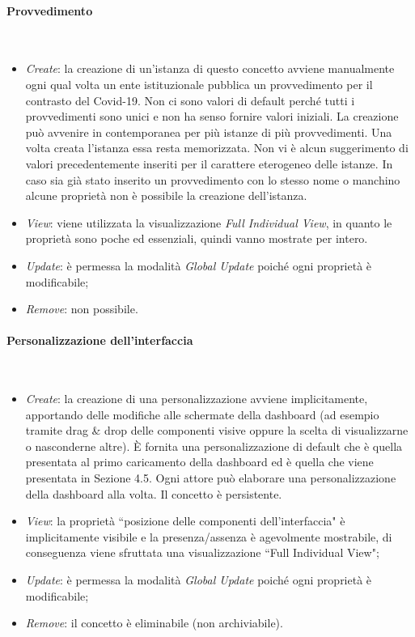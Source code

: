 \paragraph{Provvedimento}\mbox{}\\
\begin{itemize}
    \item \textit{Create}: la creazione di un'istanza di questo concetto avviene manualmente ogni qual volta un ente istituzionale pubblica un provvedimento per il contrasto del Covid-19.
    Non ci sono valori di default perché tutti i provvedimenti sono unici e non ha senso fornire valori iniziali.
    La creazione può avvenire in contemporanea per più istanze di più provvedimenti.
    Una volta creata l'istanza essa resta memorizzata.
    Non vi è alcun suggerimento di valori precedentemente inseriti per il carattere eterogeneo delle istanze.
    In caso sia già stato inserito un provvedimento con lo stesso nome o manchino alcune proprietà non è possibile la creazione dell'istanza.
    \item \textit{View}: viene utilizzata la visualizzazione \textit{Full Individual View}, in quanto le proprietà sono poche ed essenziali, quindi vanno mostrate per intero.
    \item \textit{Update}: è permessa la modalità \textit{Global Update} poiché ogni proprietà è modificabile;
    \item \textit{Remove}: non possibile.
\end{itemize}

\paragraph{Personalizzazione dell'interfaccia}\mbox{}\\
\begin{itemize}
    \item \textit{Create}: la creazione di una personalizzazione avviene implicitamente, apportando delle modifiche alle schermate della dashboard (ad esempio tramite drag \& drop delle componenti visive oppure la scelta di visualizzarne o nasconderne altre).
    È fornita una personalizzazione di default che è quella presentata al primo caricamento della dashboard ed è quella che viene presentata in Sezione 4.5.
    Ogni attore può elaborare una personalizzazione della dashboard alla volta.
    Il concetto è persistente.
    \item \textit{View}: la proprietà ``posizione delle componenti dell'interfaccia" è implicitamente visibile e la presenza/assenza è agevolmente mostrabile, di conseguenza viene sfruttata una visualizzazione ``Full Individual View";
    \item \textit{Update}: è permessa la modalità \textit{Global Update} poiché ogni proprietà è modificabile;
    \item \textit{Remove}: il concetto è eliminabile (non archiviabile).
\end{itemize}
